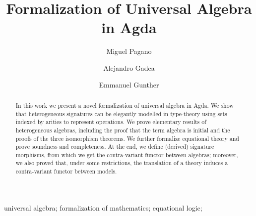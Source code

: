 \documentclass{msc}
\begin{document}


\title{Formalization of Universal Algebra in Agda}

\begin{authgrp}
  \author{Miguel Pagano}
  \author{Alejandro Gadea}
\author{ Emmanuel Gunther}


\end{authgrp}



\begin{abstract}
In this work we present a novel formalization of
universal algebra in Agda. We show that heterogeneous signatures can
be elegantly modelled in type-theory using sets indexed by arities to
represent operations. We prove elementary results of heterogeneous
algebras, including the proof that the term algebra is initial and the
proofs of the three isomorphism theorems. We further formalize equational theory and
prove soundness and completeness. At the end, we define (derived)
signature morphisms, from which we get the contra-variant functor
between algebras; moreover, we also proved that, under some
restrictions, the translation of a theory induces a contra-variant
functor between models.
\end{abstract}

\begin{keywords}
  universal algebra; formalization of mathematics; equational logic;
\end{keywords}

\maketitle


\end{document}
